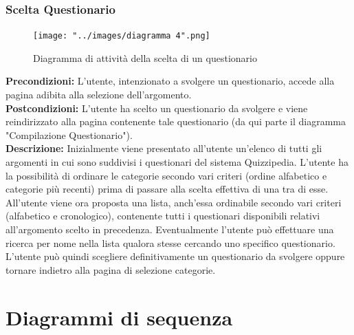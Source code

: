 \documentclass[a4paper,11pt]{article}
\begin{document}
\subsubsection{Scelta Questionario}
\begin{figure}[h!]
\begin{center}
	\texttt{[image: "../images/diagramma 4".png]}
	\caption{Diagramma di attività della scelta di un questionario}
\end{center}
\end{figure}
\textbf{Precondizioni:} L'utente, intenzionato a svolgere un questionario, accede alla pagina adibita alla selezione dell'argomento.\\
\textbf{Postcondizioni:} L'utente ha scelto un questionario da svolgere e viene reindirizzato alla pagina contenente tale questionario (da qui parte il diagramma "Compilazione Questionario").\\
\textbf{Descrizione:} Inizialmente viene presentato all'utente un'elenco di tutti gli argomenti in cui sono suddivisi i questionari del sistema Quizzipedia. L'utente ha la possibilità di ordinare le categorie secondo vari criteri (ordine alfabetico e categorie più recenti) prima di passare alla scelta effettiva di una tra di esse. All'utente viene ora proposta una lista, anch'essa ordinabile secondo vari criteri (alfabetico e cronologico), contenente tutti i questionari disponibili relativi all'argomento scelto in precedenza. Eventualmente l'utente può effettuare una ricerca per nome nella lista qualora stesse cercando uno specifico questionario. L'utente può quindi scegliere definitivamente un questionario da svolgere oppure tornare indietro alla pagina di selezione categorie.\\
\newpage
	\section{Diagrammi di sequenza}
\end{document}
